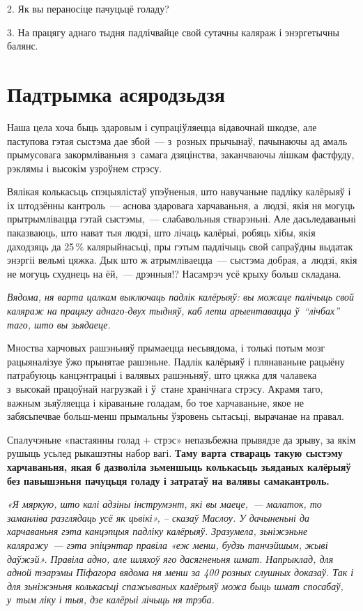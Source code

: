2. Як вы пераносіце пачуцьцё голаду?

3. На працягу аднаго тыдня падлічвайце свой сутачны каляраж і энэргетычны балянс.


\section{Падтрымка асяродзьдзя}

Наша цела хоча быць здаровым і супраціўляецца відавочнай шкодзе, але паступова гэтая сыстэма дае збой~--- з~розных прычынаў, пачынаючы ад амаль прымусовага закормліваньня з~самага дзяцінства, заканчваючы лішкам фастфуду, рэклямы і высокім узроўнем стрэсу. 


Вялікая колькасьць спэцыялістаў упэўненыя, што навучаньне падліку калёрыяў і іх штодзённы кантроль~--- аснова здаровага харчаваньня, а~людзі, якія ня могуць прытрымлівацца гэтай сыстэмы,~--- слабавольныя стварэньні. Але дасьледаваньні паказваюць, што нават тыя людзі, што лічаць калёрыі, робяць хібы, якія даходзяць да 25\,\% калярыйнасьці, пры гэтым падлічыць свой сапраўдны выдатак энэргіі вельмі цяжка. Дык што ж атрымліваецца~--- сыстэма добрая, а~людзі, якія не могуць схуднець на ёй,~--- дрэнныя!? Насамрэч усё крыху больш складана. 

\emph{Вядома, ня варта цалкам выключаць падлік калёрыяў: вы можаце палічыць свой каляраж на працягу аднаго-двух тыдняў, каб лепш арыентавацца ў~``лічбах'' таго, што вы зьядаеце.}

Мноства харчовых рашэньняў прымаецца несьвядома, і толькі потым мозг рацыяналізуе ўжо прынятае рашэньне. Падлік калёрыяў і плянаваньне рацыёну патрабуюць канцэнтрацыі і валявых рашэньняў, што цяжка для чалавека з~высокай працоўнай нагрузкай і ў~стане хранічнага стрэсу. Акрамя таго, важным зьяўляецца і кіраваньне голадам, бо тое харчаваньне, якое не забясьпечвае больш-менш прымальны ўзровень сытасьці, вырачанае на правал. 

Спалучэньне «пастаянны голад + стрэс» непазьбежна прывядзе да зрыву, за якім рушыць усьлед рыкашэтны набор вагі. \textbf{Таму варта ствараць такую сыстэму харчаваньня, якая б дазволіла зьменшыць колькасьць зьяданых калёрыяў без павышэньня пачуцьця голаду і затратаў на валявы самакантроль.}

\emph{«Я мяркую, што калі адзіны інструмэнт, які вы маеце,~--- малаток, то заманліва разглядаць усё як цьвікі», -- сказаў Маслоу. У дачыненьні да харчаваньня гэта канцэпцыя падліку калёрыяў. Зразумела, зьніжэньне каляражу~--- гэта эпіцэнтар правіла «еж менш, будзь танчэйшым, жыві даўжэй». Правіла адно, але шляхоў яго дасягненьня шмат. Напрыклад, для адной тэарэмы Піфагора вядома ня менш за 400 розных слушных доказаў. Так і для зьніжэньня колькасьці спажываных калёрыяў можа быць шмат спосабаў, у~тым ліку і тыя, дзе калёрыі лічыць ня трэба.}


